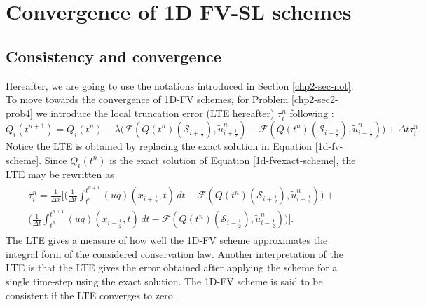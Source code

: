 \section{Convergence of 1D FV-SL schemes}
\label{convergence-1dfvsl}
\subsection{Consistency and convergence}
\label{chp2-sub-CC}
Hereafter, we are going to use the notations introduced in Section \ref{chp2-sec-not}.
To move towards the convergence of 1D-FV schemes, for  Problem \ref{chp2-sec2-prob4} we introduce the local truncation error (LTE hereafter)
$\tau_i^n$ following \citet{leveque:2002}:
\begin{equation}
	\label{consistency-1d-eq1}
	Q_i(t^{n+1}) = Q_i(t^n) - \lambda
	\bigg(\mathcal{F}(Q(t^n)(\mathcal{S}_{i+\frac{1}{2}}),\tilde{u}^n_{i+\frac{1}{2}})-
	\mathcal{F}(Q(t^n)(\mathcal{S}_{i-\frac{1}{2}}),\tilde{u}^n_{i-\frac{1}{2}}) \bigg) + \Delta t \tau_i^n.
\end{equation}
Notice the LTE is obtained by replacing the exact solution in Equation \eqref{1d-fv-scheme}.
Since $Q_i(t^n)$ is the exact solution of Equation \eqref{1d-fvexact-scheme}, 
the LTE may be rewritten as
\begin{align}
	\begin{split}
		\label{consistency-1d-eq2}
		\tau_{i}^n = 
		\frac{1}{\Delta x} \bigg[  \bigg( \frac{1}{\Delta t}\int_{t^{n}}^{t^{n+1}}
		{(uq)}(x_{i+\frac{1}{2}}, t) \,dt - \mathcal{F}(Q(t^n)(\mathcal{S}_{i+\frac{1}{2}} ),\tilde{u}^n_{i+\frac{1}{2}}) \bigg) +\\
		\bigg( \frac{1}{\Delta t}\int_{t^{n}}^{t^{n+1}}
		{(uq)}(x_{i-\frac{1}{2}}, t) \,dt - \mathcal{F}(Q(t^n)(\mathcal{S}_{i-\frac{1}{2}} ),\tilde{u}^n_{i-\frac{1}{2}}) \bigg)
		\bigg].
	\end{split}
\end{align}
The LTE gives a measure of how well the 1D-FV scheme approximates the integral form
of the considered conservation law. 
Another interpretation of the LTE is that the LTE gives the error obtained after applying
the scheme for a single time-step using the exact solution.
The 1D-FV scheme is said to be consistent
if the LTE converges to zero.


